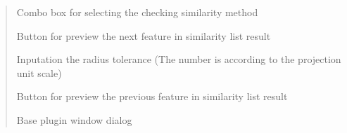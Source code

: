 \documentclass[letterpaper,10pt,english]{sphinxmanual}
\begin{document}
\begin{quote}
\begin{fulllineitems}
\end{fulllineitems}



\begin{fulllineitems}
Combo box for selecting the checking similarity method

\end{fulllineitems}



\begin{fulllineitems}
Button for preview the next feature in similarity list result

\end{fulllineitems}



\begin{fulllineitems}
Inputation the radius tolerance (The number is according to the projection unit scale)

\end{fulllineitems}



\begin{fulllineitems}
\end{fulllineitems}



\begin{fulllineitems}
\end{fulllineitems}



\begin{fulllineitems}
\end{fulllineitems}



\begin{fulllineitems}
Button for preview the previous feature in similarity list result

\end{fulllineitems}



\begin{fulllineitems}
Base plugin window dialog


\end{fulllineitems}
\end{quote}
\end{document}
